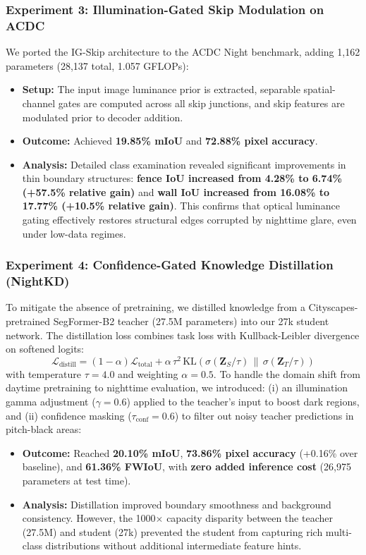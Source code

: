 \documentclass[conference]{IEEEtran}
\begin{document}
\subsubsection{Experiment 3: Illumination-Gated Skip Modulation on ACDC}
We ported the IG-Skip architecture to the ACDC Night benchmark, adding 1,162 parameters (28,137 total, 1.057 GFLOPs):
\begin{itemize}
    \item \textbf{Setup:} The input image luminance prior is extracted, separable spatial-channel gates are computed across all skip junctions, and skip features are modulated prior to decoder addition.
    \item \textbf{Outcome:} Achieved \textbf{19.85\% mIoU} and \textbf{72.88\% pixel accuracy}.
    \item \textbf{Analysis:} Detailed class examination revealed significant improvements in thin boundary structures: \textbf{fence IoU increased from 4.28\% to 6.74\% (+57.5\% relative gain)} and \textbf{wall IoU increased from 16.08\% to 17.77\% (+10.5\% relative gain)}. This confirms that optical luminance gating effectively restores structural edges corrupted by nighttime glare, even under low-data regimes.
\end{itemize}

\subsubsection{Experiment 4: Confidence-Gated Knowledge Distillation (NightKD)}
To mitigate the absence of pretraining, we distilled knowledge from a Cityscapes-pretrained SegFormer-B2 teacher (27.5M parameters) into our 27k student network. The distillation loss combines task loss with Kullback-Leibler divergence on softened logits:
\begin{equation}
\mathcal{L}_{\text{distill}} = (1 - \alpha) \mathcal{L}_{\text{total}} + \alpha \, \tau^2 \, \text{KL}\left(\sigma(\mathbf{Z}_S / \tau) \,\|\, \sigma(\mathbf{Z}_T / \tau)\right)
\end{equation}
with temperature $\tau = 4.0$ and weighting $\alpha = 0.5$. To handle the domain shift from daytime pretraining to nighttime evaluation, we introduced: (i) an illumination gamma adjustment ($\gamma = 0.6$) applied to the teacher's input to boost dark regions, and (ii) confidence masking ($\tau_{\text{conf}} = 0.6$) to filter out noisy teacher predictions in pitch-black areas:
\begin{itemize}
    \item \textbf{Outcome:} Reached \textbf{20.10\% mIoU}, \textbf{73.86\% pixel accuracy} (+0.16\% over baseline), and \textbf{61.36\% FWIoU}, with \textbf{zero added inference cost} (26,975 parameters at test time).
    \item \textbf{Analysis:} Distillation improved boundary smoothness and background consistency. However, the 1000$\times$ capacity disparity between the teacher (27.5M) and student (27k) prevented the student from capturing rich multi-class distributions without additional intermediate feature hints.
\end{itemize}
\end{document}
